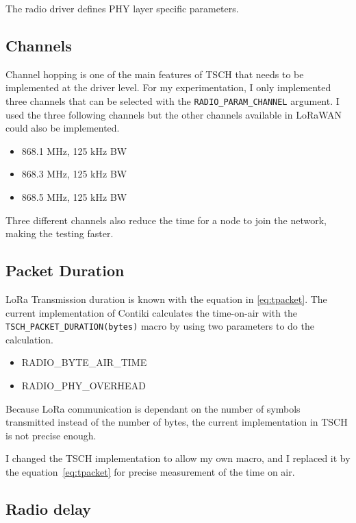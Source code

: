 The radio driver defines PHY layer specific parameters.

\subsection{Channels}

Channel hopping is one of the main features of TSCH that needs to be implemented
at the driver level.
For my experimentation, I only implemented three channels that can be selected
with the \lstinline{RADIO_PARAM_CHANNEL} argument.
I used the three following channels but the other channels available in LoRaWAN
could also be implemented.

\begin{itemize}
  \item 868.1 MHz, 125 kHz BW
  \item 868.3 MHz, 125 kHz BW
  \item 868.5 MHz, 125 kHz BW
\end{itemize}

Three different channels also reduce the time for a node to join the network,
making the testing faster.

\subsection{Packet Duration\label{section:transmissiontime}}

LoRa Transmission duration is known with the equation in \ref{eq:tpacket}.
The current implementation of Contiki calculates the time-on-air with the
\lstinline{TSCH_PACKET_DURATION(bytes)} macro by using two parameters to do the
calculation.

\begin{itemize}
  \item RADIO\_BYTE\_AIR\_TIME
  \item RADIO\_PHY\_OVERHEAD
\end{itemize}

Because LoRa communication is dependant on the number of symbols transmitted
instead of the number of bytes, the current implementation in TSCH is not
precise enough.

I changed the TSCH implementation to allow my own macro, and
I replaced it by the equation~\ref{eq:tpacket} for precise measurement
of the time on air.

\subsection{Radio delay}

